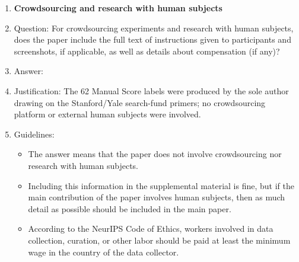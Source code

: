 \documentclass{article}
\begin{document}
\begin{enumerate}
\item {\bf Crowdsourcing and research with human subjects}
    \item[] Question: For crowdsourcing experiments and research with human subjects, does the paper include the full text of instructions given to participants and screenshots, if applicable, as well as details about compensation (if any)?
    \item[] Answer: \answerNA{}
    \item[] Justification: The 62 Manual Score labels were produced by the sole author drawing on the Stanford/Yale search-fund primers; no crowdsourcing platform or external human subjects were involved.
    \item[] Guidelines:
    \begin{itemize}
        \item The answer \answerNA{} means that the paper does not involve crowdsourcing nor research with human subjects.
        \item Including this information in the supplemental material is fine, but if the main contribution of the paper involves human subjects, then as much detail as possible should be included in the main paper.
        \item According to the NeurIPS Code of Ethics, workers involved in data collection, curation, or other labor should be paid at least the minimum wage in the country of the data collector.
    \end{itemize}


\end{enumerate}
\end{document}
